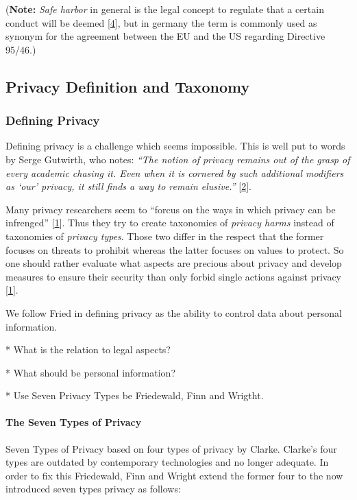 (\textbf{Note:} \emph{Safe harbor} in general is the legal concept to
regulate that a certain conduct will be deemed
{[}\hyperref[references]{4}{]}, but in germany the term is commonly used
as synonym for the agreement between the EU and the US regarding
Directive 95/46.)


\subsection{Privacy Definition and Taxonomy}

\subsubsection{Defining Privacy}

Defining privacy is a challenge which seems impossible. This is well put
to words by Serge Gutwirth, who notes: \emph{``The notion of privacy
remains out of the grasp of every academic chasing it. Even when it is
cornered by such additional modifiers as `our' privacy, it still finds a
way to remain elusive.''} {[}\hyperref[references]{2}{]}.

Many privacy researchers seem to ``forcus on the ways in which privacy
can be infrenged'' {[}\hyperref[references]{1}{]}. Thus they try to
create taxonomies of \emph{privacy harms} instead of taxonomies of
\emph{privacy types}. Those two differ in the respect that the former
focuses on threats to prohibit whereas the latter focuses on values to
protect. So one should rather evaluate what aspects are precious about
privacy and develop measures to ensure their security than only forbid
single actions against privacy {[}\hyperref[references]{1}{]}.

\begin{center}
We follow Fried in defining privacy as the ability to control data about personal information.
\end{center}

* What is the relation to legal aspects?

* What should be personal information?

* Use Seven Privacy Types be Friedewald, Finn and Wrigtht.

\paragraph{The Seven Types of Privacy}

Seven Types of Privacy based on four types of privacy by Clarke.
Clarke's four types are outdated by contemporary technologies and no longer adequate. 
In order to fix this Friedewald, Finn and Wright extend the former four to the now introduced seven types privacy as follows:

